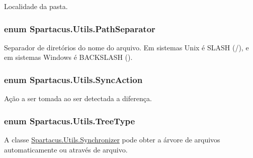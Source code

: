 Localidade da pasta. 

\hypertarget{namespaceSpartacus_1_1Utils_a9ee24558a33d60b42674bae3eed2a094}{
\subsubsection[{Path\+Separator}]{\setlength{\rightskip}{0pt plus 5cm}enum {\bf Spartacus.\+Utils.\+Path\+Separator}}}\label{namespaceSpartacus_1_1Utils_a9ee24558a33d60b42674bae3eed2a094}


Separador de diretórios do nome do arquivo. Em sistemas Unix é S\+L\+A\+S\+H (/), e em sistemas Windows é B\+A\+C\+K\+S\+L\+A\+S\+H (). 

\hypertarget{namespaceSpartacus_1_1Utils_a835f63b39808393d4b72d203056ae42e}{
\subsubsection[{Sync\+Action}]{\setlength{\rightskip}{0pt plus 5cm}enum {\bf Spartacus.\+Utils.\+Sync\+Action}}}\label{namespaceSpartacus_1_1Utils_a835f63b39808393d4b72d203056ae42e}


Ação a ser tomada ao ser detectada a diferença. 

\hypertarget{namespaceSpartacus_1_1Utils_ae4b47116ae1dc35f3dc3ea735874beee}{
\subsubsection[{Tree\+Type}]{\setlength{\rightskip}{0pt plus 5cm}enum {\bf Spartacus.\+Utils.\+Tree\+Type}}}\label{namespaceSpartacus_1_1Utils_ae4b47116ae1dc35f3dc3ea735874beee}


A classe \hyperlink{classSpartacus_1_1Utils_1_1Synchronizer}{Spartacus.\+Utils.\+Synchronizer} pode obter a árvore de arquivos automaticamente ou através de arquivo. 


